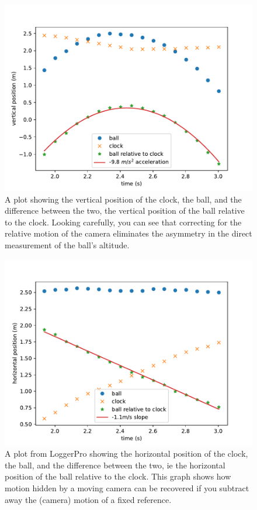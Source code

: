 \documentclass[12pt]{iopart}
\begin{document}
\begin{figure}[h]
\centering
\includegraphics[width=\columnwidth]{figure_4_Etkina-Y-T-plot.pdf}
\caption{
A plot showing the vertical position of the clock, the ball, and the difference between the two, the vertical position of the ball relative to the clock. 
Looking carefully, you can see that correcting for the relative motion of the camera eliminates the asymmetry in the direct measurement of the ball's altitude.  
}
\label{Etkina-Y-T-plot}
\end{figure}

\begin{figure}[h]
\centering
\includegraphics[width=\columnwidth]{figure_5_Etkina-X-T-plot.pdf}
\caption{
A plot from LoggerPro showing the horizontal position of the clock, the ball, and the difference between the two, ie the horizontal position of the ball relative to the clock.  This graph shows how motion hidden by a moving camera can be recovered if you subtract away the (camera) motion of a fixed reference.
}
\label{Etkina-X-T-plot}
\end{figure}
\end{document}
